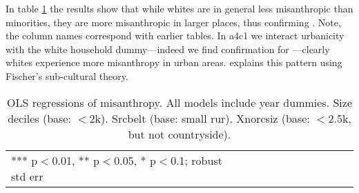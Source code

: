 \documentclass[11pt, letterpaper]{article}
\begin{document}
\begin{spacing}{1.4}
 
In table \ref{regE} the results show that while whites are in general less misanthropic
than minorities, they are more misanthropic in larger places, thus confirming
\citet{wilson85}. Note, the column names correspond with earlier tables.  
 In a4c1 we interact urbanicity with the white household dummy---indeed we find confirmation for \citet{wilson85}---clearly whites
 experience more misanthropy in urban areas. \citet{wilson85} explains this
 pattern 
 using Fischer's sub-cultural theory.

 \begin{spacing}{.67}
   \begin{table}[H]\centering
     \caption{OLS regressions  of misanthropy. All models include year
       dummies. Size deciles (base: $<$2k). Srcbelt (base: small rur). Xnorcsiz (base: $<$2.5k, but not countryside).} \label{regE}
     \begin{tiny} \begin{tabular}{p{1.2in}p{.45in}p{.45in}p{.45in}p{.45in}p{.45in}p{.45in}p{.45in}p{.45in}p{.45in}p{.45 in}}\hline
         
         \hline  *** p$<$0.01, ** p$<$0.05, * p$<$0.1; robust std err
       \end{tabular}\end{tiny}\end{table}
 \end{spacing}



 
\end{spacing}
\end{document}
